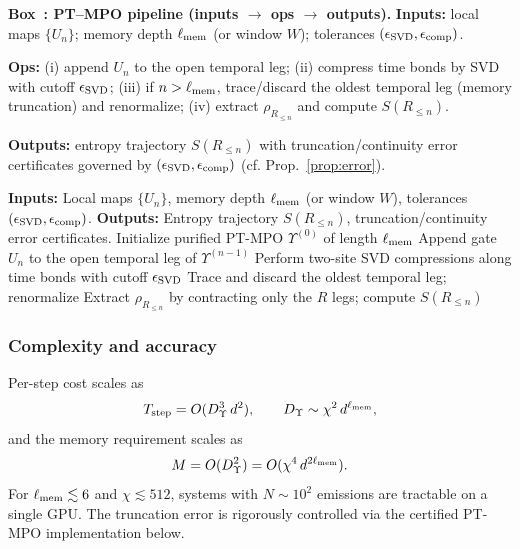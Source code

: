 \documentclass[11pt,a4paper]{article}
\newcounter{boxedresult}
\newenvironment{boxedresult}[1]{\refstepcounter{boxedresult}\begin{infobox}\noindent\textbf{Box~\theboxedresult: #1.}}{\end{infobox}}
\theoremstyle{plain}
\theoremstyle{definition}
\theoremstyle{remark}
\begin{document}
\begin{boxedresult}{PT--MPO pipeline (inputs $\to$ ops $\to$ outputs)}\label{box:ptmpo-pipeline}
\noindent\textbf{Inputs:} local maps $\{U_n\}$; memory depth $\ell_{\rm mem}$ (or window $W$); tolerances $(\epsilon_{\rm SVD},\epsilon_{\rm comp})$.

\noindent\textbf{Ops:} (i) append $U_n$ to the open temporal leg; (ii) compress time bonds by SVD with cutoff $\epsilon_{\rm SVD}$; (iii) if $n>\ell_{\rm mem}$, trace/discard the oldest temporal leg (memory truncation) and renormalize; (iv) extract $\rho_{R_{\le n}}$ and compute $S(R_{\le n})$.

\noindent\textbf{Outputs:} entropy trajectory $S(R_{\le n})$ with truncation/continuity error certificates governed by $(\epsilon_{\rm SVD},\epsilon_{\rm comp})$ (cf. Prop.~\ref{prop:error}).
\end{boxedresult}

\begin{algorithm}[t!]
\caption{PT-TEBD for the Horizon Memory Comb.}
\label{alg:ptmpo}
\begin{algorithmic}[1]
\State \textbf{Inputs:} Local maps $\{U_n\}$, memory depth $\ell_{\rm mem}$ (or window $W$), tolerances $(\epsilon_{\rm SVD},\epsilon_{\rm comp})$.
\State \textbf{Outputs:} Entropy trajectory $S(R_{\le n})$, truncation/continuity error certificates.
\State Initialize purified PT-MPO $\Upsilon^{(0)}$ of length $\ell_{\rm mem}$
  \State Append gate $U_n$ to the open temporal leg of $\Upsilon^{(n-1)}$
  \State Perform two-site SVD compressions along time bonds with cutoff $\epsilon_{\rm SVD}$
   \State Trace and discard the oldest temporal leg; renormalize
  \EndIf
  \State Extract $\rho_{R_{\le n}}$ by contracting only the $R$ legs; compute $S(R_{\le n})$
\EndFor
\end{algorithmic}
\end{algorithm}

\subsubsection{Complexity and accuracy}
Per-step cost scales as
\[
T_{\rm step}=O(D_{\Upsilon}^3\,d^2),\qquad D_{\Upsilon}\sim \chi^2\, d^{\ell_{\rm mem}},
\]
and the memory requirement scales as
\[
M=O(D_{\Upsilon}^2)=O(\chi^4\, d^{2\ell_{\rm mem}}).
\]
For $\ell_{\rm mem}\lesssim 6$ and $\chi\lesssim 512$, systems with $N\sim 10^2$ emissions are tractable on a single GPU. The truncation error is rigorously controlled via the certified PT-MPO implementation below.
\end{document}

